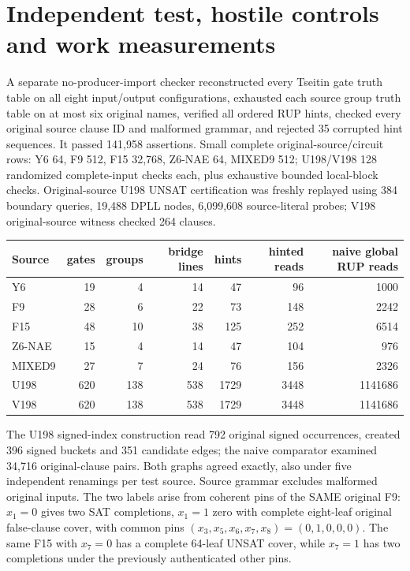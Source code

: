 \documentclass[11pt]{article}
\begin{document}
\section{Independent test, hostile controls and work measurements}
A separate no-producer-import checker reconstructed every Tseitin gate truth table on all eight input/output configurations, exhausted each source group truth table on at most six original names, verified all ordered RUP hints, checked every original source clause ID and malformed grammar, and rejected 35 corrupted hint sequences. It passed 141,958 assertions. Small complete original-source/circuit rows: Y6 64, F9 512, F15 32,768, Z6-NAE 64, MIXED9 512; U198/V198 128 randomized complete-input checks each, plus exhaustive bounded local-block checks. Original-source U198 UNSAT certification was freshly replayed using 384 boundary queries, 19,488 DPLL nodes, 6,099,608 source-literal probes; V198 original-source witness checked 264 clauses.

\begin{center}\small
\begin{tabular}{lrrrrrr}\toprule
Source&gates&groups&bridge lines&hints&hinted reads&naive global RUP reads\\\midrule
Y6&19&4&14&47&96&1000\\
F9&28&6&22&73&148&2242\\
F15&48&10&38&125&252&6514\\
Z6-NAE&15&4&14&47&104&976\\
MIXED9&27&7&24&76&156&2326\\
U198&620&138&538&1729&3448&1141686\\
V198&620&138&538&1729&3448&1141686\\\bottomrule
\end{tabular}
\end{center}
The U198 signed-index construction read 792 original signed occurrences, created 396 signed buckets and 351 candidate edges; the naive comparator examined 34,716 original-clause pairs. Both graphs agreed exactly, also under five independent renamings per test source. Source grammar excludes malformed original inputs. The two labels arise from coherent pins of the SAME original F9: $x_1=0$ gives two SAT completions, $x_1=1$ zero with complete eight-leaf original false-clause cover, with common pins $(x_3,x_5,x_6,x_7,x_8)=(0,1,0,0,0)$. The same F15 with $x_7=0$ has a complete 64-leaf UNSAT cover, while $x_7=1$ has two completions under the previously authenticated other pins.
\end{document}
